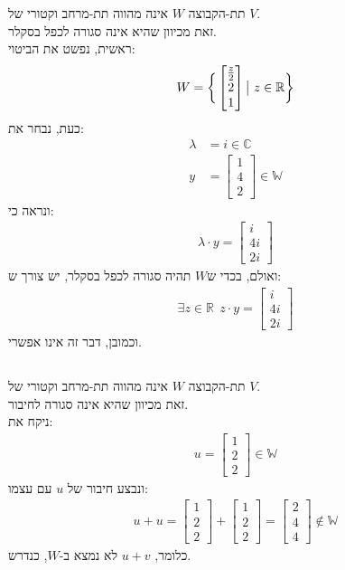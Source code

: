 \documentclass[a4paper, 12pt, leqno]{article}
\newcommand{\sub}[1]{\subsection{\underline{#1}}}
\newcommand{\eq}[1]{\begin{align*}#1\end{align*}}
\newcommand{\bigset}[1]{\bigg{\{} #1 \bigg{\}}}
\begin{document}
\section{}
\setcounter{subsection}{3}
\sub{}
תת-הקבוצה $W$ אינה מהווה תת-מרחב וקטורי של $V$.\\
זאת מכיוון שהיא אינה סגורה לכפל בסקלר.\\
ראשית, נפשט את הביטוי:
\eq{
    W=\bigset{\begin{bmatrix}
        \frac{z}{2}\\2\\1
    \end{bmatrix}
    \big{|}~z\in\mathbb{R}
    }
}
כעת, נבחר את:
\eq{
    \lambda&=i\in\mathbb{C}\\
    y&=\begin{bmatrix}
        1\\4\\2
    \end{bmatrix}
    \in\mathbb{W}
}
ונראה כי:
\eq{
    \lambda\cdot{y}=\begin{bmatrix}
        i\\4i\\2i
    \end{bmatrix}
}
ואולם, בכדי ש$W$ תהיה סגורה לכפל בסקלר,  יש צורך ש:
\eq{
    \exists{z}\in\mathbb{R}~~z\cdot{y}=\begin{bmatrix}
        i\\4i\\2i
    \end{bmatrix}
}
וכמובן, דבר זה אינו אפשרי.
\sub{}
תת-הקבוצה $W$ אינה מהווה תת-מרחב וקטורי של $V$.\\
זאת מכיוון שהיא אינה סגורה לחיבור.\\
ניקח את:
\eq{
    u=\begin{bmatrix}
        1\\2\\2
    \end{bmatrix}
    \in\mathbb{W}
}
ונבצע חיבור של $u$ עם עצמו:
\eq{
    u+u=\begin{bmatrix}
        1\\2\\2
    \end{bmatrix}
    +
    \begin{bmatrix}
        1\\2\\2
    \end{bmatrix}
    =
    \begin{bmatrix}
        2\\4\\4
    \end{bmatrix}
    \not\in\mathbb{W}
}
כלומר, $u+v$ לא נמצא ב-$W$, כנדרש.
\end{document}
